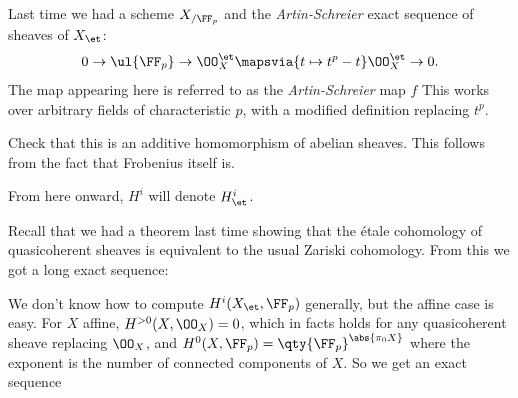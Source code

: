 Last time we had a scheme \(X_{/\FF_p}\) and the \emph{Artin-Schreier}
exact sequence of sheaves of \(X_\et\):
\begin{align*}  
0\to \ul{\FF_p} \to \OO_X^\et \mapsvia{t\mapsto t^p - t} \OO_X^\et \to 0
.\end{align*} The map appearing here is referred to as the
\emph{Artin-Schreier} map \(f\) This works over arbitrary fields of
characteristic \(p\), with a modified definition replacing \(t^p\).

\begin{exercise}[?]

Check that this is an additive homomorphism of abelian sheaves. This
follows from the fact that Frobenius itself is.

\end{exercise}

\begin{remark}

From here onward, \(H^i\) will denote \(H^i_\et\).

\end{remark}

Recall that we had a theorem last time showing that the étale cohomology
of quasicoherent sheaves is equivalent to the usual Zariski cohomology.
From this we got a long exact sequence:

\begin{center}
\end{center}

We don't know how to compute \(H^i(X_\et, \FF_p)\) generally, but the
affine case is easy. For \(X\) affine, \(H^{>0}(X, \OO_X) = 0\), which
in facts holds for any quasicoherent sheave replacing \(\OO_X\), and
\(H^0(X, \FF_p) = \qty{\FF_p}^{\abs {\pi_0 X} }\) where the exponent is
the number of connected components of \(X\). So we get an exact sequence

\begin{center}
\end{center}

